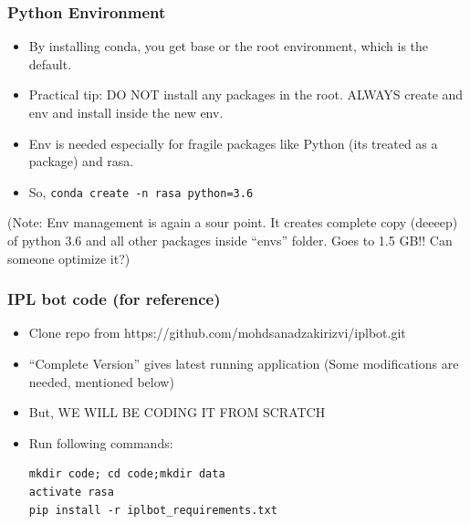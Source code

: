 
 \begin{frame}[fragile]\frametitle{Python Environment}
\begin{itemize}
\item By installing conda, you get base or the root environment, which is the default.
\item Practical tip: DO NOT install any packages in the root. ALWAYS create and env and install inside the new env.
\item Env is needed especially for fragile packages like Python (its treated as a package) and rasa.
\item So, \lstinline|conda create -n rasa python=3.6| 
\end{itemize}

(Note: Env management is again a sour point. It creates complete copy (deeeep) of python 3.6 and all other packages inside ``envs'' folder. Goes to 1.5 GB!! Can someone optimize it?)
\end{frame}

 \begin{frame}[fragile]\frametitle{IPL bot code (for reference)}
\begin{itemize}
\item Clone repo from https://github.com/mohdsanadzakirizvi/iplbot.git
\item  ``Complete Version'' gives latest running application (Some modifications are needed, mentioned below)
\item But, WE WILL BE CODING IT FROM SCRATCH
\item Run following commands:

\begin{lstlisting}
mkdir code; cd code;mkdir data
activate rasa
pip install -r iplbot_requirements.txt
\end{lstlisting}

\end{itemize}
\end{frame}



